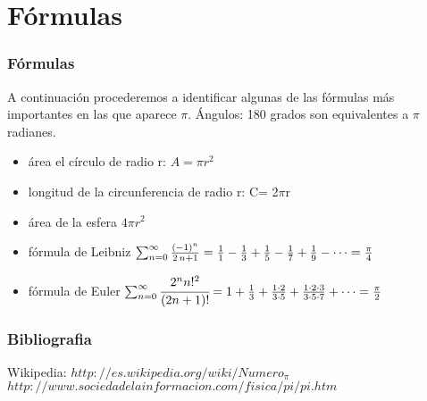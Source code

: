 \documentclass{beamer}
\begin{document}
\section {Fórmulas}
\begin{frame}
\frametitle{Fórmulas}
\begin{block}
A continuación procederemos a identificar algunas de las fórmulas más importantes en las que aparece $\pi$.
%
%
%
Ángulos: 180 grados son equivalentes a $\pi$ radianes.
%
%
\begin{itemize}
\item área el círculo de radio r: $A=\pi r^2$ \pause  
\item longitud de la circunferencia de radio r: C= 2$\pi$r \pause
\item área de la esfera $4 \pi r^2$ \pause
\item fórmula de Leibniz $\sum_{n=0}^{\infty }{{{\left(-1\right)^{n}}\over{2\,n+1}}}=\frac{1}{1} - \frac{1}{3} + \frac{1}{5} - \frac{1}{7} + \frac{1}{9} - \cdots = \frac{\pi}{4} $ \pause
\item fórmula de Euler $\sum_{n=0}^{\infty }\cfrac{2^n n!^2}{(2n + 1)!}=1 + \frac{1}{3} + \frac{1 \cdot 2}{3 \cdot 5} + \frac{1 \cdot 2 \cdot 3}{3 \cdot 5 \cdot 7} + \cdots = \frac{\pi}{2}$ 
%
\end{itemize}
%
\end{block}
\end{frame}

\begin{frame}
\frametitle{Bibliografia}
\begin{thebibliography}{10}
\beamertemplatebookbibitems
{}
Wikipedia:
{\small $ http://es.wikipedia.org/wiki/Numero_\pi $}
{\small $ http://www.sociedadelainformacion.com/fisica/pi/pi.htm $}
\end{thebibliography}
\end{frame}
\end{document}
